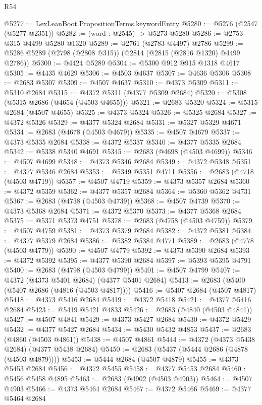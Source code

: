 \begin{lexlean}{R54}
\begin{coremodule}
@5277 := LexLeanBoot.PropositionTerms.keywordEntry
@5280 := @5276 (@2547 (@5277 @2351))
@5282 := (word : @2545) -> @5273 @5280
@5286 := @2753 @315 @4499 @5280 @1320
@5289 := @2761 (@2783 @4497) @2786
@5299 := @5286 @5289 (@2798 (@2808 @315)) (@2814 (@2815 (@2816 @1320) @4499 @2786))
@5300 := @4424 @5289
@5304 := @5300 @912 @915 @1318 @4617
@5305 := @4435 @4629
@5306 := @4503 @4637
@5307 := @4636 @5306
@5308 := @2683 @5307
@5309 := @4507 @4637
@5310 := @4373 @5309
@5311 := @5310 @2684
@5315 := @4372 @5311 (@4377 @5309 @2684)
@5320 := @5308 (@5315 @2686 (@4654 (@4503 @4655)))
@5321 := @2683 @5320
@5324 := @5315 @2684 (@4507 @4655)
@5325 := @4373 @5324
@5326 := @5325 @2684
@5327 := @4372 @5326
@5329 := @4377 @5324 @2684
@5331 := @5327 @5329 @4671
@5334 := @2683 (@4678 (@4503 @4679))
@5335 := @4507 @4679
@5337 := @4373 @5335 @2684
@5338 := @4372 @5337
@5340 := @4377 @5335 @2684
@5342 := @5338 @5340 @4691
@5345 := @2683 (@4698 (@4503 @4699))
@5346 := @4507 @4699
@5348 := @4373 @5346 @2684
@5349 := @4372 @5348
@5351 := @4377 @5346 @2684
@5353 := @5349 @5351 @4711
@5356 := @2683 (@4718 (@4503 @4719))
@5357 := @4507 @4719
@5359 := @4373 @5357 @2684
@5360 := @4372 @5359
@5362 := @4377 @5357 @2684
@5364 := @5360 @5362 @4731
@5367 := @2683 (@4738 (@4503 @4739))
@5368 := @4507 @4739
@5370 := @4373 @5368 @2684
@5371 := @4372 @5370
@5373 := @4377 @5368 @2684
@5375 := @5371 @5373 @4751
@5378 := @2683 (@4758 (@4503 @4759))
@5379 := @4507 @4759
@5381 := @4373 @5379 @2684
@5382 := @4372 @5381
@5384 := @4377 @5379 @2684
@5386 := @5382 @5384 @4771
@5389 := @2683 (@4778 (@4503 @4779))
@5390 := @4507 @4779
@5392 := @4373 @5390 @2684
@5393 := @4372 @5392
@5395 := @4377 @5390 @2684
@5397 := @5393 @5395 @4791
@5400 := @2683 (@4798 (@4503 @4799))
@5401 := @4507 @4799
@5407 := @4372 (@4373 @5401 @2684) (@4377 @5401 @2684)
@5413 := @2683 (@5400 (@5407 @2686 (@4816 (@4503 @4817))))
@5416 := @5407 @2684 (@4507 @4817)
@5418 := @4373 @5416 @2684
@5419 := @4372 @5418
@5421 := @4377 @5416 @2684
@5423 := @5419 @5421 @4833
@5426 := @2683 (@4840 (@4503 @4841))
@5427 := @4507 @4841
@5429 := @4373 @5427 @2684
@5430 := @4372 @5429
@5432 := @4377 @5427 @2684
@5434 := @5430 @5432 @4853
@5437 := @2683 (@4860 (@4503 @4861))
@5438 := @4507 @4861
@5444 := @4372 (@4373 @5438 @2684) (@4377 @5438 @2684)
@5450 := @2683 (@5437 (@5444 @2686 (@4878 (@4503 @4879))))
@5453 := @5444 @2684 (@4507 @4879)
@5455 := @4373 @5453 @2684
@5456 := @4372 @5455
@5458 := @4377 @5453 @2684
@5460 := @5456 @5458 @4895
@5463 := @2683 (@4902 (@4503 @4903))
@5464 := @4507 @4903
@5466 := @4373 @5464 @2684
@5467 := @4372 @5466
@5469 := @4377 @5464 @2684

\end{coremodule}
\end{lexlean}
